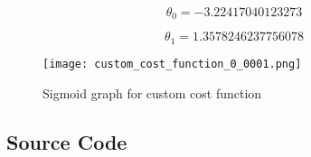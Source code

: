 \begin{equation}
\theta_0 = -3.22417040123273
\end{equation}

\begin{equation}
\theta_1 = 1.3578246237756078
\end{equation}

\begin{figure}[!ht]
  \texttt{[image: custom\_cost\_function\_0\_0001.png]}
  \caption{Sigmoid graph for custom cost function}
  \label{fig:custom_cost_function}
\end{figure}

\subsection{Source Code}


